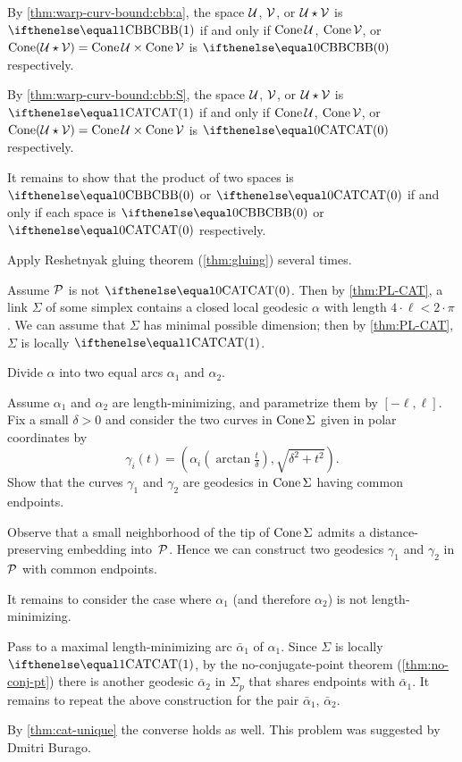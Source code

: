 By \ref{thm:warp-curv-bound:cbb:a}, the space $\mathcal{U}$, $\mathcal{V}$, or $\mathcal{U}\star\mathcal{V}$ is $\Alex1$ if and only if $\mathop{\rm Cone}\nolimits\mathcal{U}$, $\mathop{\rm Cone}\nolimits\mathcal{V}$, or $\Cone(\spc{U}\star\spc{V})=\Cone\spc{U}\times\Cone\spc{V}$ is $\Alex0$ respectively.

By \ref{thm:warp-curv-bound:cbb:S}, the space $\mathcal{U}$, $\mathcal{V}$, or $\mathcal{U}\star\mathcal{V}$ is $\CAT1$ if and only if $\mathop{\rm Cone}\nolimits\mathcal{U}$, $\mathop{\rm Cone}\nolimits\mathcal{V}$, or $\Cone(\spc{U}\star\spc{V})=\Cone\spc{U}\times\Cone\spc{V}$ is $\CAT0$ respectively.

It remains to show that the product of two spaces is $\Alex0$ or $\CAT0$ if and only if each space is $\Alex0$ or $\CAT0$ respectively.

Apply Reshetnyak gluing theorem (\ref{thm:gluing}) several times.

Assume $\mathcal{P}$ is not $\CAT0$.
Then by \ref{thm:PL-CAT}, a link $\Sigma$ of some simplex contains a closed local geodesic $\alpha$ with length $4\cdot\ell<2\cdot\pi$.
We can assume that $\Sigma$ has minimal possible dimension;
then by \ref{thm:PL-CAT}, $\Sigma$ is locally $\CAT1$.

Divide $\alpha$ into two equal arcs $\alpha_1$ and $\alpha_2$.

Assume $\alpha_1$ and $\alpha_2$ are length-minimizing, and 
parametrize them by $[-\ell,\ell]$.
Fix a small $\delta>0$ and 
consider the two curves in $\mathop{\rm Cone}\nolimits\Sigma$ given in polar coordinates by 
\[\gamma_i(t)=(\alpha_i(\arctan \tfrac t\delta),\sqrt{\delta^2+t^2}).\]
Show that the curves $\gamma_1$ and $\gamma_2$ are geodesics in $\mathop{\rm Cone}\nolimits\Sigma$ having common endpoints.

Observe that a small neighborhood of the tip of $\mathop{\rm Cone}\nolimits\Sigma$ admits a distance-preserving embedding into~$\mathcal{P}$.
Hence we can construct two geodesics $\gamma_1$ and $\gamma_2$ in $\mathcal{P}$ with common endpoints.

It remains to consider the case where $\alpha_1$ (and therefore $\alpha_2$) is not length-minimizing.

Pass to a maximal length-minimizing arc $\bar\alpha_1$ of $\alpha_1$.
Since $\Sigma$ is locally $\CAT1$, by the no-conjugate-point theorem (\ref{thm:no-conj-pt}) 
there is another geodesic $\bar\alpha_2$ in $\Sigma_p$ that shares endpoints with $\bar\alpha_1$.
It remains to repeat the above construction for the pair $\bar\alpha_1$, $\bar\alpha_2$.

By \ref{thm:cat-unique} the converse holds as well.
This problem was suggested by Dmitri Burago.

